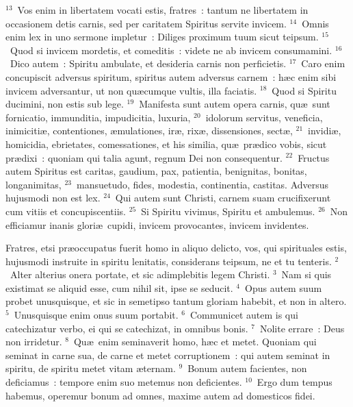 ${}^{13}$~Vos enim in libertatem vocati estis, fratres~: tantum ne libertatem in occasionem detis carnis, sed per caritatem Spiritus servite invicem.
${}^{14}$~Omnis enim lex in uno sermone impletur~: Diliges proximum tuum sicut teipsum.
${}^{15}$~Quod si invicem mordetis, et comeditis~: videte ne ab invicem consumamini.
${}^{16}$~Dico autem~: Spiritu ambulate, et desideria carnis non perficietis.
${}^{17}$~Caro enim concupiscit adversus spiritum, spiritus autem adversus carnem~: h\ae c enim sibi invicem adversantur, ut non qu\ae cumque vultis, illa faciatis.
${}^{18}$~Quod si Spiritu ducimini, non estis sub lege.
${}^{19}$~Manifesta sunt autem opera carnis, qu\ae\ sunt fornicatio, immunditia, impudicitia, luxuria,
${}^{20}$~idolorum servitus, veneficia, inimiciti\ae , contentiones, \ae mulationes, ir\ae , rix\ae , dissensiones, sect\ae ,
${}^{21}$~invidi\ae , homicidia, ebrietates, comessationes, et his similia, qu\ae\ pr\ae dico vobis, sicut pr\ae dixi~: quoniam qui talia agunt, regnum Dei non consequentur.
${}^{22}$~Fructus autem Spiritus est caritas, gaudium, pax, patientia, benignitas, bonitas, longanimitas,
${}^{23}$~mansuetudo, fides, modestia, continentia, castitas. Adversus hujusmodi non est lex.
${}^{24}$~Qui autem sunt Christi, carnem suam crucifixerunt cum vitiis et concupiscentiis.
${}^{25}$~Si Spiritu vivimus, Spiritu et ambulemus.
${}^{26}$~Non efficiamur inanis glori\ae\ cupidi, invicem provocantes, invicem invidentes.

\bchapter
\lettrine[lines=3,image=true,loversize=0.05,lraise=-0.03]{F}{}ratres, etsi pr\ae occupatus fuerit homo in aliquo delicto, vos, qui spirituales estis, hujusmodi instruite in spiritu lenitatis, considerans teipsum, ne et tu tenteris.
${}^{2}$~Alter alterius onera portate, et sic adimplebitis legem Christi.
${}^{3}$~Nam si quis existimat se aliquid esse, cum nihil sit, ipse se seducit.
${}^{4}$~Opus autem suum probet unusquisque, et sic in semetipso tantum gloriam habebit, et non in altero.
${}^{5}$~Unusquisque enim onus suum portabit.
${}^{6}$~Communicet autem is qui catechizatur verbo, ei qui se catechizat, in omnibus bonis.
${}^{7}$~Nolite errare~: Deus non irridetur.
${}^{8}$~Qu\ae\ enim seminaverit homo, h\ae c et metet. Quoniam qui seminat in carne sua, de carne et metet corruptionem~: qui autem seminat in spiritu, de spiritu metet vitam \ae ternam.
${}^{9}$~Bonum autem facientes, non deficiamus~: tempore enim suo metemus non deficientes.
${}^{10}$~Ergo dum tempus habemus, operemur bonum ad omnes, maxime autem ad domesticos fidei.


